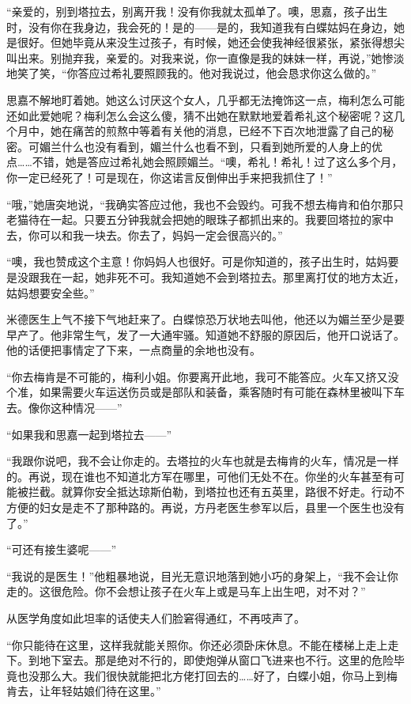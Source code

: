 \par “亲爱的，别到塔拉去，别离开我！没有你我就太孤单了。噢，思嘉，孩子出生时，没有你在我身边，我会死的！是的——是的，我知道我有白蝶姑妈在身边，她是很好。但她毕竟从来没生过孩子，有时候，她还会使我神经很紧张，紧张得想尖叫出来。别抛弃我，亲爱的。对我来说，你一直像是我的妹妹一样，再说，”她惨淡地笑了笑，“你答应过希礼要照顾我的。他对我说过，他会恳求你这么做的。”
\par 思嘉不解地盯着她。她这么讨厌这个女人，几乎都无法掩饰这一点，梅利怎么可能还如此爱她呢？梅利怎么会这么傻，猜不出她在默默地爱着希礼这个秘密呢？这几个月中，她在痛苦的煎熬中等着有关他的消息，已经不下百次地泄露了自己的秘密。可媚兰什么也没有看到，媚兰什么也看不到，只看到她所爱的人身上的优点……不错，她是答应过希礼她会照顾媚兰。“噢，希礼！希礼！过了这么多个月，你一定已经死了！可是现在，你这诺言反倒伸出手来把我抓住了！”
\par “哦，”她唐突地说，“我确实答应过他，我也不会毁约。可我不想去梅肯和伯尔那只老猫待在一起。只要五分钟我就会把她的眼珠子都抓出来的。我要回塔拉的家中去，你可以和我一块去。你去了，妈妈一定会很高兴的。”
\par “噢，我也赞成这个主意！你妈妈人也很好。可是你知道的，孩子出生时，姑妈要是没跟我在一起，她非死不可。我知道她不会到塔拉去。那里离打仗的地方太近，姑妈想要安全些。”
\par 米德医生上气不接下气地赶来了。白蝶惊恐万状地去叫他，他还以为媚兰至少是要早产了。他非常生气，发了一大通牢骚。知道她不舒服的原因后，他开口说话了。他的话便把事情定了下来，一点商量的余地也没有。
\par “你去梅肯是不可能的，梅利小姐。你要离开此地，我可不能答应。火车又挤又没个准，如果需要火车运送伤员或是部队和装备，乘客随时有可能在森林里被叫下车去。像你这种情况——”
\par “如果我和思嘉一起到塔拉去——”
\par “我跟你说吧，我不会让你走的。去塔拉的火车也就是去梅肯的火车，情况是一样的。再说，现在谁也不知道北方军在哪里，可他们无处不在。你坐的火车甚至有可能被拦截。就算你安全抵达琼斯伯勒，到塔拉也还有五英里，路很不好走。行动不方便的妇女是走不了那种路的。再说，方丹老医生参军以后，县里一个医生也没有了。”
\par “可还有接生婆呢——”
\par “我说的是医生！”他粗暴地说，目光无意识地落到她小巧的身架上，“我不会让你走的。这很危险。你不会想让孩子在火车上或是马车上出生吧，对不对？”
\par 从医学角度如此坦率的话使夫人们脸窘得通红，不再吱声了。
\par “你只能待在这里，这样我就能关照你。你还必须卧床休息。不能在楼梯上走上走下。到地下室去。那是绝对不行的，即使炮弹从窗口飞进来也不行。这里的危险毕竟也没那么大。我们很快就能把北方佬打回去的……好了，白蝶小姐，你马上到梅肯去，让年轻姑娘们待在这里。”
